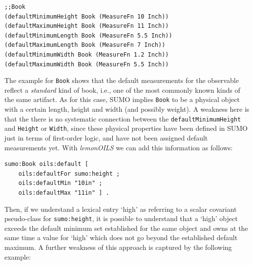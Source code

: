 \documentclass[11pt]{article}
\begin{document}
\begin{small}\begin{verbatim}
;;Book
(defaultMinimumHeight Book (MeasureFn 10 Inch))
(defaultMaximumHeight Book (MeasureFn 11 Inch))
(defaultMinimumLength Book (MeasureFn 5.5 Inch))
(defaultMaximumLength Book (MeasureFn 7 Inch))
(defaultMinimumWidth Book (MeasureFn 1.2 Inch))
(defaultMaximumWidth Book (MeasureFn 5.5 Inch))
\end{verbatim}\end{small}

The example for \texttt{Book} shows that the default measurements for the observable reflect a \textit{standard} kind of book,
i.e., one of the most commonly known kinds of the same artifact. As for this case, SUMO implies \texttt{Book} to be a physical object with a certain length, height and width (and possibly weight). 
A weakness here is that the there is no systematic connection between the {\tt defaultMinimumHeight} and {\tt Height} or {\tt Width}, since these physical properties have been defined in SUMO just in terms of first-order logic, and have not been assigned default measurements yet. With \emph{lemonOILS} we can add this information as follows:

\begin{small}\begin{verbatim}
sumo:Book oils:default [
    oils:defaultFor sumo:height ;
    oils:defaultMin "10in" ;
    oils:defaultMax "11in" ] .
\end{verbatim}\end{small}

Then, if we understand a lexical entry `high' as referring to a scalar covariant pseudo-class for {\tt sumo:height},
it is possible to understand that a `high' object exceeds the default minimum set established for the same object and owns at the same time a value for `high' which does not go beyond the established default maximum. %
A further weakness of this approach is captured by the following example:
\end{document}
